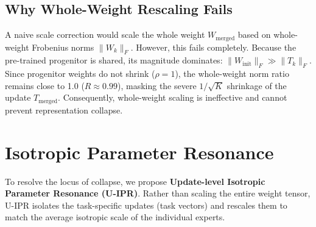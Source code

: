 \documentclass{article}
\begin{document}
\subsection{Why Whole-Weight Rescaling Fails}
A naive scale correction would scale the whole weight $W_{\text{merged}}$ based on whole-weight Frobenius norms $\|W_k\|_F$. However, this fails completely. Because the pre-trained progenitor is shared, its magnitude dominates: $\|W_{\text{init}}\|_F \gg \|T_k\|_F$. Since progenitor weights do not shrink ($\rho = 1$), the whole-weight norm ratio remains close to 1.0 ($R \approx 0.99$), masking the severe $1/\sqrt{K}$ shrinkage of the update $T_{\text{merged}}$. Consequently, whole-weight scaling is ineffective and cannot prevent representation collapse.

\section{Isotropic Parameter Resonance}
\label{sec:method}
To resolve the locus of collapse, we propose \textbf{Update-level Isotropic Parameter Resonance
(U-IPR)}. Rather than scaling the entire weight tensor, U-IPR isolates the task-specific updates
(task vectors) and rescales them to match the average isotropic scale of the individual experts.
\end{document}
